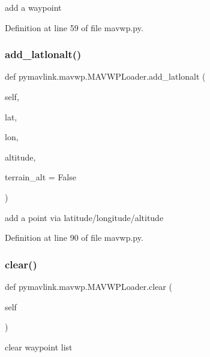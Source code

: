 \begin{DoxyVerb}add a waypoint\end{DoxyVerb}
 

Definition at line 59 of file mavwp.\+py.

\mbox{\label{classpymavlink_1_1mavwp_1_1MAVWPLoader_a6e998a58eea829205e8c4c3cb75de107}} 
\subsubsection{\texorpdfstring{add\_latlonalt()}{add\_latlonalt()}}
{\footnotesize\ttfamily def pymavlink.\+mavwp.\+M\+A\+V\+W\+P\+Loader.\+add\+\_\+latlonalt (\begin{DoxyParamCaption}\item[{}]{self,  }\item[{}]{lat,  }\item[{}]{lon,  }\item[{}]{altitude,  }\item[{}]{terrain\+\_\+alt = {\ttfamily False} }\end{DoxyParamCaption})}

\begin{DoxyVerb}add a point via latitude/longitude/altitude\end{DoxyVerb}
 

Definition at line 90 of file mavwp.\+py.

\mbox{\label{classpymavlink_1_1mavwp_1_1MAVWPLoader_a292abb3c99ba217989fd7ea399d434de}} 
\subsubsection{\texorpdfstring{clear()}{clear()}}
{\footnotesize\ttfamily def pymavlink.\+mavwp.\+M\+A\+V\+W\+P\+Loader.\+clear (\begin{DoxyParamCaption}\item[{}]{self }\end{DoxyParamCaption})}

\begin{DoxyVerb}clear waypoint list\end{DoxyVerb}
 

